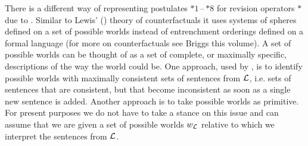 There is a different way of representing postulates $*1$\,--\,$*8$ for revision operators $*$ due to \citet{g88}. Similar to Lewis' (\citeyear{l73}) theory of counterfactuals it uses systems of spheres defined on a set of possible worlds instead of entrenchment orderings defined on a formal language (for more on counterfactuals see Briggs this volume). A set of possible worlds can be thought of as a set of complete, or maximally specific, descriptions of the way the world could be. One approach, used by \citet{g88}, is to identify possible worlds with maximally consistent sets of sentences from $\cal L$, i.e. sets of sentences that are consistent, but that become inconsistent as soon as a single new sentence is added. Another approach is to take possible worlds as primitive. For present purposes we do not have to take a stance on this issue and can assume that we are given a set of possible worlds $w_{\cal L}$ relative to which we interpret the sentences from $\cal L$.


